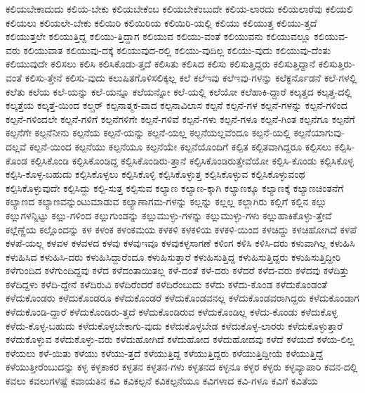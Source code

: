{ಕಲಿಯಬೇಕಾದುದು
ಕಲಿಯ-ಬೇಕು
ಕಲಿಯಬೇಕೆಂಬ
ಕಲಿಯಬೇಕೆಂಬುದೇ
ಕಲಿಯ-ಲಾರದು
ಕಲಿಯಲಾರೆವು
ಕಲಿಯಲಿ
ಕಲಿಯಲು
ಕಲಿಯಲೇ-ಬೇಕು
ಕಲಿಯಿರಿ
ಕಲಿಯಿರಿಯ
ಕಲಿಯಿರಿ-ಯಲ್ಲಿ
ಕಲಿಯು
ಕಲಿಯುತ್ತ
ಕಲಿಯು-ತ್ತದೆ
ಕಲಿಯುತ್ತಲೇ
ಕಲಿಯುತ್ತಿದ್ದ
ಕಲಿಯು-ತ್ತಿದ್ದಾಗ
ಕಲಿಯುವ
ಕಲಿಯು-ವಂತೆ
ಕಲಿಯುವನು
ಕಲಿಯುವಲ್ಲೂ
ಕಲಿಯುವ-ವರು
ಕಲಿಯುವಾತ
ಕಲಿಯುವು-ದಕ್ಕೆ
ಕಲಿಯುವುದ-ರಲ್ಲಿ
ಕಲಿಯು-ವುದಿಲ್ಲ
ಕಲಿಯು-ವುದು
ಕಲಿಯುವು-ದೆಂತು
ಕಲಿಯುವುದೇ
ಕಲಿಸಲು
ಕಲಿಸಿ
ಕಲಿಸಿಕೊಡು-ತ್ತದೆ
ಕಲಿಸಿತು
ಕಲಿಸಿದ
ಕಲಿಸು
ಕಲಿಸುತ್ತಿದ್ದರು
ಕಲಿಸುತ್ತಿದ್ದಾನೆ
ಕಲಿಸುತ್ತಿರು-ವಂತೆ
ಕಲಿಸು-ತ್ತೇನೆ
ಕಲಿಸು-ವುದು
ಕಲುಷಿತಗೊಳಿಸಲಿಕ್ಕಲ್ಲ
ಕಲೆ
ಕಲೆಇವು
ಕಲೆಇವು-ಗಳನ್ನು
ಕಲೆಕ್ಟರ್ನೊಡನೆ
ಕಲೆ-ಗಳಲ್ಲಿ
ಕಲೆತು
ಕಲೆಯ
ಕಲೆ-ಯನ್ನು
ಕಲೆ-ಯನ್ನೂ
ಕಲೆಯನ್ನೋ
ಕಲೆ-ಯಲ್ಲಿ
ಕಲೆಯೋ
ಕಲೆಹಾಕಿ-ದ್ದಾರೆ
ಕಲ್ಕತ್ತದ
ಕಲ್ಕತ್ತ-ದಲ್ಲಿ
ಕಲ್ಕತ್ತೆಯ
ಕಲ್ಕತ್ತೆ-ಯಿಂದ
ಕಲ್ಚರ್
ಕಲ್ಪನಾತ್ಮಕ-ವಾದ
ಕಲ್ಪನಾವಿಲಾಸ
ಕಲ್ಪನೆ
ಕಲ್ಪನೆ-ಗಳ
ಕಲ್ಪನೆ-ಗಳನ್ನು
ಕಲ್ಪನೆ-ಗಳಿಂದ
ಕಲ್ಪನೆ-ಗಳಿಂದಲೇ
ಕಲ್ಪನೆ-ಗಳಿಗೆ
ಕಲ್ಪನೆಗಳಿಗೇ
ಕಲ್ಪನೆ-ಗಳಿವೆ
ಕಲ್ಪನೆ-ಗಳು
ಕಲ್ಪನೆ-ಗಳೂ
ಕಲ್ಪನೆ-ಗಿಂತ
ಕಲ್ಪನೆಗೂ
ಕಲ್ಪನೆಗೆ
ಕಲ್ಪನೆಗೇ
ಕಲ್ಪನೆನೀನು
ಕಲ್ಪನೆಯ
ಕಲ್ಪನೆ-ಯನ್ನು
ಕಲ್ಪನೆ-ಯಲ್ಲ
ಕಲ್ಪನೆಯಲ್ಲವೆಂದೂ
ಕಲ್ಪನೆ-ಯಲ್ಲಿ
ಕಲ್ಪನೆಯಾಗುವು-ದಲ್ಲವೆ
ಕಲ್ಪನೆ-ಯಿಂದ
ಕಲ್ಪನೆಯು
ಕಲ್ಪನೆಯೂ
ಕಲ್ಪನೆಯೇ
ಕಲ್ಪನೆಯೊಂದಿಗೆ
ಕಲ್ಪಿತ
ಕಲ್ಪಿತವಾಗಿದ್ದರೂ
ಕಲ್ಪಿಸಲು
ಕಲ್ಪಿಸಿ-ಕೊಂಡ
ಕಲ್ಪಿಸಿಕೊಂಡಿ
ಕಲ್ಪಿಸಿಕೊಂಡಿದ್ದ
ಕಲ್ಪಿಸಿಕೊಂಡಿರು-ತ್ತಾನೆ
ಕಲ್ಪಿಸಿಕೊಂಡಿರುತ್ತೇವೆಯೋ
ಕಲ್ಪಿಸಿ-ಕೊಂಡು
ಕಲ್ಪಿಸಿಕೊಳ್ಳ
ಕಲ್ಪಿಸಿ-ಕೊಳ್ಳ-ಬಹುದು
ಕಲ್ಪಿಸಿಕೊಳ್ಳಲು
ಕಲ್ಪಿಸಿಕೊಳ್ಳಿ
ಕಲ್ಪಿಸಿಕೊಳ್ಳುತ್ತ
ಕಲ್ಪಿಸಿಕೊಳ್ಳುವ
ಕಲ್ಪಿಸಿಕೊಳ್ಳುವಂಥ
ಕಲ್ಪಿಸಿಕೊಳ್ಳುವುದೇ
ಕಲ್ಪಿಸಿದ್ದು
ಕಲ್ಪಿ-ಸುತ್ತ
ಕಲ್ಪಿಸುವ
ಕಲ್ಯಾಣ
ಕಲ್ಯಾಣ-ಕ್ಕಾಗಿ
ಕಲ್ಯಾಣಕ್ಕೂ
ಕಲ್ಯಾಣಕ್ಕೆ
ಕಲ್ಯಾಣಚಿಂತನೆಗೆ
ಕಲ್ಯಾಣದ
ಕಲ್ಯಾಣವನ್ನುಂಟುಮಾಡುವ
ಕಲ್ಯಾಣಾಗಮ-ಗಳನ್ನು
ಕಲ್ಲನ್ನು
ಕಲ್ಲಲ್ಲ
ಕಲ್ಲಾಗಿರು
ಕಲ್ಲಿಗೆ
ಕಲ್ಲಿನ
ಕಲ್ಲು
ಕಲ್ಲುಗಳನ್ನಿಟ್ಟು
ಕಲ್ಲು-ಗಳಿಂದ
ಕಲ್ಲುಗುಂಡನ್ನು
ಕಲ್ಲುಮುಳ್ಳು-ಗಳನ್ನು
ಕಲ್ಲುಮುಳ್ಳು-ಗಳು
ಕಲ್ಲುಹಾಕಿಕೊಳ್ಳು-ತ್ತೇವೆ
ಕಲ್ಲೆಣ್ಣೆಯ
ಕಲ್ಲೊಂದನ್ನು
ಕಳ
ಕಳಂಕ
ಕಳಂಕಮಯ
ಕಳಕಳಿ
ಕಳಕಳಿಯ
ಕಳಕಳಿ-ಯಿಂದ
ಕಳಚಿದ್ದು
ಕಳಚಿಹೋಗಿದೆ
ಕಳಪೆ
ಕಳಪೆ-ಯಲ್ಲ
ಕಳವಳ
ಕಳವಳದ
ಕಳವು
ಕಳವುಇವೂ
ಕಳವುಕಳ್ಳಸಾಗಣೆ
ಕಳಿಂಗ
ಕಳಿಸಿ
ಕಳಿಸಿ-ದರು
ಕಳುವಾಗಿಲ್ಲ
ಕಳುಹಿಸಿ
ಕಳುಹಿಸಿದ
ಕಳುಹಿಸಿ-ದರು
ಕಳುಹಿಸಿದ್ದಾರೆಂದೂ
ಕಳುಹಿಸುತ್ತಾರೆ
ಕಳುಹಿಸುತ್ತಿದ್ದ
ಕಳುಹಿಸುತ್ತಿದ್ದರು
ಕಳುಹಿಸುತ್ತಿದ್ದೀರಿ
ಕಳೆಗುಂದಿದ
ಕಳೆಗುಂದಿದ್ದವು
ಕಳೆದ
ಕಳೆದಂತಾಯಿತಲ್ಲ
ಕಳೆ-ದಂತೆ
ಕಳೆ-ದರು
ಕಳೆದರೆ
ಕಳೆದ-ವರು
ಕಳೆದವು
ಕಳೆದಿತ್ತು
ಕಳೆದಿದ್ದಳು
ಕಳೆದಿ-ದ್ದೇನೆ
ಕಳೆದಿರುವಿ
ಕಳೆದಿರೆಂದರೆ
ಕಳೆದಿರೆಂಬುದು
ಕಳೆದು
ಕಳೆದು-ಕೊಂಡ
ಕಳೆದುಕೊಂಡಂತೆ
ಕಳೆದುಕೊಂಡರು
ಕಳೆದುಕೊಂಡರೂ
ಕಳೆದುಕೊಂಡರೆ
ಕಳೆದುಕೊಂಡವನಲ್ಲ
ಕಳೆದುಕೊಂಡವರಾಗಿದ್ದರು
ಕಳೆದುಕೊಂಡಾಗ
ಕಳೆದುಕೊಂಡಿ-ದ್ದಾರೆ
ಕಳೆದುಕೊಂಡಿರು-ತ್ತದೆ
ಕಳೆದುಕೊಂಡಿರುವ
ಕಳೆದುಕೊಂಡಿಲ್ಲ
ಕಳೆದು-ಕೊಂಡು
ಕಳೆದುಕೊಳ್ಳ
ಕಳೆದು-ಕೊಳ್ಳ-ಬಹುದು
ಕಳೆದುಕೊಳ್ಳಬೇಕಾಗು-ವುದು
ಕಳೆದುಕೊಳ್ಳಬೇಡ
ಕಳೆದುಕೊಳ್ಳ-ಲಾರರು
ಕಳೆದುಕೊಳ್ಳುತ್ತಾರೆ
ಕಳೆದುಕೊಳ್ಳುವ
ಕಳೆದುಕೊಳ್ಳು-ವರು
ಕಳೆದುಹೋಗಿದೆ
ಕಳೆದುಹೋದ
ಕಳೆದುಹೋದವು
ಕಳೆದೆ
ಕಳೆಯದೆ
ಕಳೆಯ-ಲಿಲ್ಲ
ಕಳೆಯಲು
ಕಳೆ-ಯಿತು
ಕಳೆಯು
ಕಳೆಯು-ತ್ತದೆ
ಕಳೆಯುತ್ತಿದ್ದ
ಕಳೆಯುತ್ತಿದ್ದರು
ಕಳೆಯುತ್ತಿದ್ದೀಯೆ
ಕಳೆಯುತ್ತಿದ್ದೆ
ಕಳೆಯುತ್ತೀರೆಂಬುದನ್ನು
ಕಳ್ಳ
ಕಳ್ಳಕಾಕರ
ಕಳ್ಳತನ
ಕಳ್ಳತನ-ಗಳು
ಕಳ್ಳತನದ
ಕಳ್ಳನೂ
ಕಳ್ಳರ
ಕಳ್ಳರು
ಕಳ್ಳವ್ಯಾಪಾರಿ
ಕವನ-ದಲ್ಲಿ
ಕವಲು
ಕವಲುಗಳಷ್ಟೆ
ಕವಾಯತಿನ
ಕವಿ
ಕವಿಕಲ್ಪನೆ
ಕವಿಕಲ್ಪನೆಯೂ
ಕವಿಗಳಾದ
ಕವಿ-ಗಳೂ
ಕವಿಗೆ
ಕವಿತೆಯ
}
